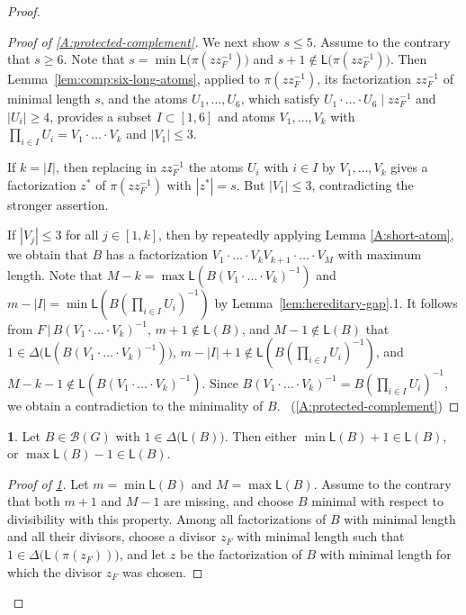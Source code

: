 \documentclass[a4paper, 10pt]{amsart}
\theoremstyle{plain}
\theoremstyle{definition}
\theoremstyle{definition}
\newtheorem{claim}{}[theorem]
\numberwithin{equation}{section}
\renewcommand{\t}{\, | \,}
\begin{document}
\begin{proof}
\begin{proof}[Proof of \ref{A:protected-complement}]
We next show $s\le 5$.
Assume to the contrary that $s\ge 6$. Note that $s=\min \mathsf L \big(\pi(zz_F^{-1}) \big)$ and $s+1\not\in \mathsf L \big(\pi(zz_F^{-1}) \big)$. Then
Lemma~\ref{lem:comp:six-long-atoms}, applied to $\pi(zz_F^{-1})$, its factorization
$zz_F^{-1}$ of minimal length $s$, and the atoms $U_1, \ldots, U_6$, which satisfy
$U_1 \cdot \ldots \cdot U_6 \mid zz_F^{-1}$ and $|U_i| \ge 4$, provides a
subset $I \subset [1,6]$ and atoms $V_1, \ldots, V_k$ with
$\prod_{i \in I}U_i = V_1 \cdot \ldots \cdot V_k$ and $|V_1| \le 3$.


If $k = |I|$, then replacing in $zz_F^{-1}$ the atoms $U_i$ with $i \in I$ by
$V_1, \ldots, V_k$ gives a factorization $z^*$ of $\pi(zz_F^{-1})$ with $|z^*| = s$. But $|V_1|\le 3$,  contradicting  the stronger assertion.


If $|V_j| \le 3$ for all $j \in [1,k]$, then  by repeatedly applying Lemma \ref{A:short-atom},  we obtain that $B$ has a factorization $V_1\cdot\ldots\cdot V_kV_{k+1}\cdot\ldots\cdot V_M$ with maximum length. Note that $M-k=\max\mathsf L(B(V_1\cdot\ldots\cdot V_k)^{-1})$ and $m-|I|=\min\mathsf L(B(\prod_{i\in I}U_i)^{-1})$ by Lemma~\ref{lem:hereditary-gap}.1. 
It follows from $F\t B(V_1\cdot\ldots\cdot V_k)^{-1}$, $m+1\notin \mathsf L(B)$, and $M-1\not\in \mathsf L(B)$ that $1\in \Delta \big(\mathsf L(B(V_1\cdot\ldots\cdot V_k)^{-1}) \big)$, $m-|I|+1\not\in \mathsf L(B(\prod_{i\in I}U_i)^{-1})$, and $M-k-1\notin \mathsf L(B(V_1\cdot\ldots\cdot V_k)^{-1})$. Since $B(V_1\cdot\ldots\cdot V_k)^{-1}=B(\prod_{i\in I}U_i)^{-1}$, we obtain a contradiction to the minimality of $B$. 
\qedhere\ (\ref{A:protected-complement})
\end{proof}

\begin{claim}\label{A:no-double-gap}
Let $B\in\mathcal B(G)$ with $1 \in \Delta \big(\mathsf L (B) \big)$.  Then either
$\min\mathsf L(B)+1\in\mathsf L(B)$, or $\max\mathsf L(B)-1\in\mathsf L(B)$.
\end{claim}

\begin{proof}[Proof of \ref{A:no-double-gap}]
	Let
	$m=\min\mathsf L(B)$ and $M=\max\mathsf L(B)$.
Assume to the contrary that both $m+1$ and $M-1$ are missing, and choose $B$
minimal with respect to divisibility with this property.  Among all 
factorizations of $B$ with minimal length and all their divisors, choose a divisor $z_F$
with minimal length such that $1 \in \Delta \big(\mathsf L (\pi (z_F)) \big)$, and let $z$ be the  factorization of $B$ with minimal length for which the divisor $z_F$ was chosen.



\end{proof}
\end{proof}
\end{document}
